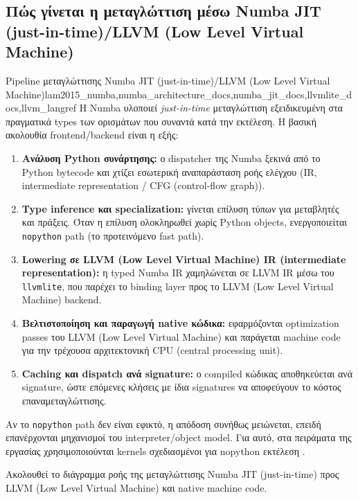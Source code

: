 \documentclass[11pt,a4paper]{report}
\begin{document}
\subsection{Πώς γίνεται η μεταγλώττιση μέσω Numba JIT (just-in-time)/LLVM (Low Level Virtual Machine)}

\begin{toolbox}{Pipeline μεταγλώττισης Numba JIT (just-in-time)/LLVM (Low Level Virtual Machine)}{lam2015_numba,numba_architecture_docs,numba_jit_docs,llvmlite_docs,llvm_langref}
Η Numba υλοποιεί \textit{just-in-time} μεταγλώττιση εξειδικευμένη στα πραγματικά
types των ορισμάτων που συναντά κατά την εκτέλεση. Η βασική ακολουθία
frontend/backend είναι η εξής:
\begin{enumerate}
\item \textbf{Ανάλυση Python συνάρτησης:} ο dispatcher της Numba ξεκινά από το
Python bytecode και χτίζει εσωτερική αναπαράσταση ροής ελέγχου (IR, intermediate representation / CFG (control-flow graph)).
\item \textbf{Type inference και specialization:} γίνεται επίλυση τύπων για μεταβλητές
και πράξεις. Όταν η επίλυση ολοκληρωθεί χωρίς Python objects, ενεργοποιείται
\texttt{nopython} path (το προτεινόμενο fast path).
\item \textbf{Lowering σε LLVM (Low Level Virtual Machine) IR (intermediate representation):} η typed Numba IR χαμηλώνεται σε LLVM IR μέσω
του \texttt{llvmlite}, που παρέχει το binding layer προς το LLVM (Low Level Virtual Machine) backend.
\item \textbf{Βελτιστοποίηση και παραγωγή native κώδικα:} εφαρμόζονται optimization
passes του LLVM (Low Level Virtual Machine) και παράγεται machine code για την τρέχουσα αρχιτεκτονική CPU (central processing unit).
\item \textbf{Caching και dispatch ανά signature:} ο compiled κώδικας αποθηκεύεται
ανά signature, ώστε επόμενες κλήσεις με ίδια signatures να αποφεύγουν το
κόστος επαναμεταγλώττισης.
\end{enumerate}
\end{toolbox}

Αν το \texttt{nopython} path δεν είναι εφικτό, η απόδοση συνήθως μειώνεται,
επειδή επανέρχονται μηχανισμοί του interpreter/object model. Για αυτό, στα
πειράματα της εργασίας χρησιμοποιούνται kernels σχεδιασμένοι για nopython
εκτέλεση \cite{numba_jit_docs,nlds_internal_scripts}.

Ακολουθεί το διάγραμμα ροής της μεταγλώττισης Numba JIT (just-in-time) προς LLVM (Low Level Virtual Machine) και native machine code.
\end{document}
